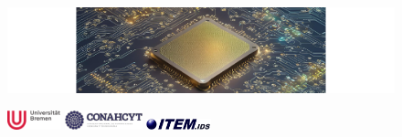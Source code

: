 {
	\begin{frame}
		\begin{figure}
			\includegraphics[width=\textwidth]{slides/figures/cover_image_3.pdf}
		\end{figure}
		\titlepage %
		\vfill %
		\begin{figure}[h]
			\begin{minipage}[b]{0.32\linewidth}
				\includegraphics[height=1.5em,keepaspectratio]{../figures/UHB_Logo_4c.pdf} %
			\end{minipage}
			\hfill
			\begin{minipage}[b]{0.32\linewidth}
				\includegraphics[height=1.5em,keepaspectratio]{../figures/conahcyt.pdf} %
			\end{minipage}
			\hfill
			\begin{minipage}[b]{0.32\linewidth}
				\includegraphics[height=0.8em,keepaspectratio]{../figures/logo_item_ids.png} %
			\end{minipage}
		\end{figure}
		
		\addtocounter{framenumber}{-1} %
	\end{frame}
}
